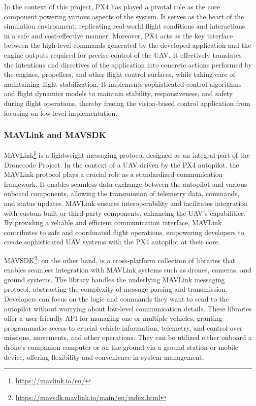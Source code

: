 In the context of this project, PX4 has played a pivotal role as the core component powering various aspects of the system. It serves as the heart of the simulation environment, replicating real-world flight conditions and interactions in a safe and cost-effective manner.
Moreover, PX4 acts as the key interface between the high-level commands generated by the developed application and the engine outputs required for precise control of the UAV. It effectively translates the intentions and directives of the application into concrete actions performed by the engines, propellers, and other flight control surfaces, while taking care of maintaining flight stabilization.
It implements sophisticated control algorithms and flight dynamics models to maintain stability, responsiveness, and safety during flight operations, thereby freeing the vision-based control application from focusing on low-level implementation.


\subsubsection{MAVLink and MAVSDK}
\label{subsec:mavlink}

MAVLink\footnote{\url{https://mavlink.io/en/}} is a lightweight messaging protocol designed as an integral part of the Dronecode Project.
In the context of a UAV driven by the PX4 autopilot, the MAVLink protocol plays a crucial role as a standardized communication framework. It enables seamless data exchange between the autopilot and various onboard components, allowing the transmission of telemetry data, commands, and status updates. MAVLink ensures interoperability and facilitates integration with custom-built or third-party components, enhancing the UAV's capabilities. By providing a reliable and efficient communication interface, MAVLink contributes to safe and coordinated flight operations, empowering developers to create sophisticated UAV systems with the PX4 autopilot at their core.

MAVSDK\footnote{\url{https://mavsdk.mavlink.io/main/en/index.html}}, on the other hand, is a cross-platform collection of libraries that enables seamless integration with MAVLink systems such as drones, cameras, and ground systems.
The library handles the underlying MAVLink messaging protocol, abstracting the complexity of message parsing and transmission. Developers can focus on the logic and commands they want to send to the autopilot without worrying about low-level communication details.
These libraries offer a user-friendly API for managing one or multiple vehicles, granting programmatic access to crucial vehicle information, telemetry, and control over missions, movements, and other operations. They can be utilized either onboard a drone's companion computer or on the ground via a ground station or mobile device, offering flexibility and convenience in system management.

